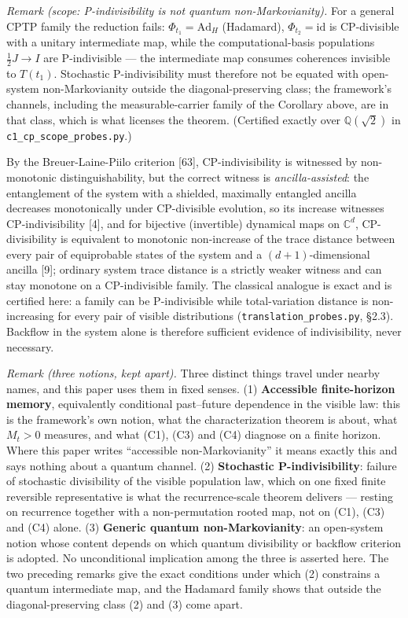 \documentclass[
]{article}
\begin{document}
\emph{Remark (scope: P-indivisibility is not quantum non-Markovianity).}
For a general CPTP family the reduction fails:
\(\Phi_{t_1} = \mathrm{Ad}_H\) (Hadamard), \(\Phi_{t_2} = \mathrm{id}\)
is CP-divisible with a unitary intermediate map, while the
computational-basis populations \(\tfrac{1}{2}J \to I\) are
P-indivisible --- the intermediate map consumes coherences invisible to
\(T(t_1)\). Stochastic P-indivisibility must therefore not be equated
with open-system non-Markovianity outside the diagonal-preserving class;
the framework's channels, including the measurable-carrier family of the
Corollary above, are in that class, which is what licenses the theorem.
(Certified exactly over \(\mathbb{Q}(\sqrt{2})\) in
\texttt{c1\_cp\_scope\_probes.py}.)

By the Breuer-Laine-Piilo criterion {[}63{]}, CP-indivisibility is
witnessed by non-monotonic distinguishability, but the correct witness
is \emph{ancilla-assisted}: the entanglement of the system with a
shielded, maximally entangled ancilla decreases monotonically under
CP-divisible evolution, so its increase witnesses CP-indivisibility
{[}4{]}, and for bijective (invertible) dynamical maps on
\(\mathbb{C}^d\), CP-divisibility is equivalent to monotonic
non-increase of the trace distance between every pair of equiprobable
states of the system and a \((d+1)\)-dimensional ancilla {[}9{]};
ordinary system trace distance is a strictly weaker witness and can stay
monotone on a CP-indivisible family. The classical analogue is exact and
is certified here: a family can be P-indivisible while total-variation
distance is non-increasing for every pair of visible distributions
(\texttt{translation\_probes.py}, §2.3). Backflow in the system alone is
therefore sufficient evidence of indivisibility, never necessary.

\emph{Remark (three notions, kept apart).} Three distinct things travel
under nearby names, and this paper uses them in fixed senses. (1)
\textbf{Accessible finite-horizon memory}, equivalently conditional
past--future dependence in the visible law: this is the framework's own
notion, what the characterization theorem is about, what \(M_t > 0\)
measures, and what (C1), (C3) and (C4) diagnose on a finite horizon.
Where this paper writes ``accessible non-Markovianity'' it means exactly
this and says nothing about a quantum channel. (2) \textbf{Stochastic
P-indivisibility}: failure of stochastic divisibility of the visible
population law, which on one fixed finite reversible representative is
what the recurrence-scale theorem delivers --- resting on recurrence
together with a non-permutation rooted map, not on (C1), (C3) and (C4)
alone. (3) \textbf{Generic quantum non-Markovianity}: an open-system
notion whose content depends on which quantum divisibility or backflow
criterion is adopted. No unconditional implication among the three is
asserted here. The two preceding remarks give the exact conditions under
which (2) constrains a quantum intermediate map, and the Hadamard family
shows that outside the diagonal-preserving class (2) and (3) come apart.
\end{document}
